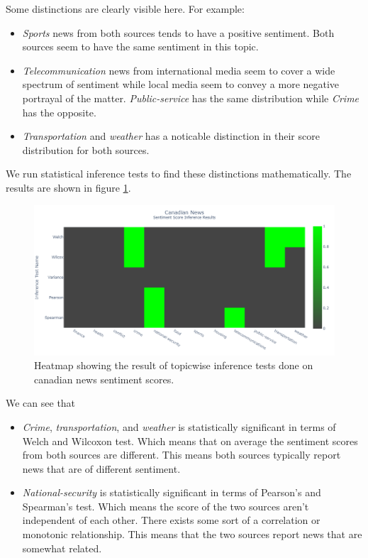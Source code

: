 \documentclass{article}
\theoremstyle{mytheoremstyle}
\theoremstyle{mytheoremstyle}
\theoremstyle{myproblemstyle}
\begin{document}
    Some distinctions are clearly visible here. For example:

    \begin{itemize}
        \item \emph{Sports} news from both sources tends to have a positive sentiment. Both sources seem to have the same sentiment in this topic.
        \item \emph{Telecommunication} news from international media seem to cover a wide spectrum of sentiment while local media seem to convey a more negative portrayal of the matter. \emph{Public-service} has the same distribution while \emph{Crime} has the opposite.
        \item \emph{Transportation} and \emph{weather} has a noticable distinction in their score distribution for both sources.
    \end{itemize}

    We run statistical inference tests to find these distinctions mathematically. The results are shown in figure \ref{fig:canada_sentiment_score_heatmap}.

    \begin{figure}[hp]
        \centering
        \includegraphics[width=\linewidth]{../images/plots/Canada/canada_heatmap_inference_sentiment.png}
        \caption{Heatmap showing the result of topicwise inference tests done on canadian news sentiment scores.}
        \label{fig:canada_sentiment_score_heatmap}
    \end{figure}

    We can see that

    \begin{itemize}
        \item \emph{Crime}, \emph{transportation}, and \emph{weather} is statistically significant in terms of Welch and Wilcoxon test. Which means that on average the sentiment scores from both sources are different. This means both sources typically report news that are of different sentiment.
        \item \emph{National-security} is statistically significant in terms of Pearson's and Spearman's test. Which means the score of the two sources aren't independent of each other. There exists some sort of a correlation or monotonic relationship. This means that the two sources report news that are somewhat related. 
    \end{itemize}
\end{document}
